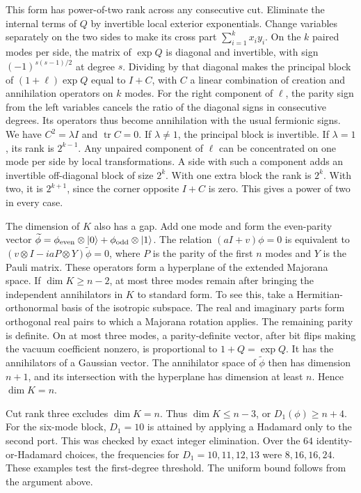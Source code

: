 \documentclass[11pt,a4paper]{article}
\numberwithin{equation}{section}
\begin{document}
This form has power-of-two rank across any consecutive cut. Eliminate the internal terms of \(Q\) by invertible local exterior exponentials. Change variables separately on the two sides to make its cross part \(\sum_{i=1}^k x_i y_i\). On the \(k\) paired modes per side, the matrix of \(\exp Q\) is diagonal and invertible, with sign \((-1)^{s(s-1)/2}\) at degree \(s\). Dividing by that diagonal makes the principal block of \((1+\ell)\exp Q\) equal to \(I+C\), with \(C\) a linear combination of creation and annihilation operators on \(k\) modes. For the right component of \(\ell\), the parity sign from the left variables cancels the ratio of the diagonal signs in consecutive degrees. Its operators thus become annihilation with the usual fermionic signs. We have \(C^2=\lambda I\) and \(\operatorname{tr}C=0\). If \(\lambda\ne1\), the principal block is invertible. If \(\lambda=1\), its rank is \(2^{k-1}\). Any unpaired component of \(\ell\) can be concentrated on one mode per side by local transformations. A side with such a component adds an invertible off-diagonal block of size \(2^k\). With one extra block the rank is \(2^k\). With two, it is \(2^{k+1}\), since the corner opposite \(I+C\) is zero. This gives a power of two in every case.

The dimension of \(K\) also has a gap. Add one mode and form the even-parity vector \(\widetilde\phi=\phi_{\rm even}\otimes|0\rangle+\phi_{\rm odd}\otimes|1\rangle\). The relation \((aI+v)\phi=0\) is equivalent to \((v\otimes I-iaP\otimes Y)\widetilde\phi=0\), where \(P\) is the parity of the first \(n\) modes and \(Y\) is the Pauli matrix. These operators form a hyperplane of the extended Majorana space. If \(\dim K\ge n-2\), at most three modes remain after bringing the independent annihilators in \(K\) to standard form. To see this, take a Hermitian-orthonormal basis of the isotropic subspace. The real and imaginary parts form orthogonal real pairs to which a Majorana rotation applies. The remaining parity is definite. On at most three modes, a parity-definite vector, after bit flips making the vacuum coefficient nonzero, is proportional to \(1+Q=\exp Q\). It has the annihilators of a Gaussian vector. The annihilator space of \(\widetilde\phi\) then has dimension \(n+1\), and its intersection with the hyperplane has dimension at least \(n\). Hence \(\dim K=n\).

Cut rank three excludes \(\dim K=n\). Thus \(\dim K\le n-3\), or \(D_1(\phi)\ge n+4\). For the six-mode block, \(D_1=10\) is attained by applying a Hadamard only to the second port. This was checked by exact integer elimination. Over the \(64\) identity-or-Hadamard choices, the frequencies for \(D_1=10,11,12,13\) were \(8,16,16,24\). These examples test the first-degree threshold. The uniform bound follows from the argument above.
\end{document}
